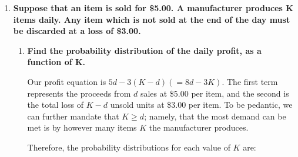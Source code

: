 \documentclass[10pt, oneside]{article}
\begin{document}
\begin{enumerate}[label=7.\arabic*]
\begin{enumerate}
	\[ E[X] = \Big( 1 \cdot 2 + 2 \cdot 2 + 3 \cdot \frac{4}{3} + 4 \cdot \frac{2}{3} \Big) \frac{1}{6} = \boxed{\frac{19}{9}} \]
	
	\item  \begin{tcolorbox}[
	  colback=Cerulean!5!white,
	  colframe=Cerulean!75!black]
	\textbf{Suppose that an item is sold for \$5.00. A manufacturer produces $\bm{K}$ items daily. Any item which is not sold at the end of the day must be discarded at a loss of \$3.00. }
	\end{tcolorbox}
	
		\begin{enumerate}
		\item  \begin{tcolorbox}[
	 	 colback=Cerulean!5!white,
	 	 colframe=Cerulean!75!black]
		\textbf{Find the probability distribution of the daily profit, as a function of $\bm{K}$.}
		\end{tcolorbox}
		
		Our profit equation is $5d - 3(K-d) (= 8d - 3K)$. The first term represents the proceeds from $d$ sales at \$5.00 per item, and the second is the total loss of $K-d$ unsold units at \$3.00 per item. To 		be pedantic, we can further mandate that $K \geq d$; namely, that the most demand can be met is by however many items $K$ the manufacturer produces.
		
		Therefore, the probability distributions for each value of $K$ are:
		

\end{enumerate}
\end{enumerate}
\end{enumerate}
\end{document}

